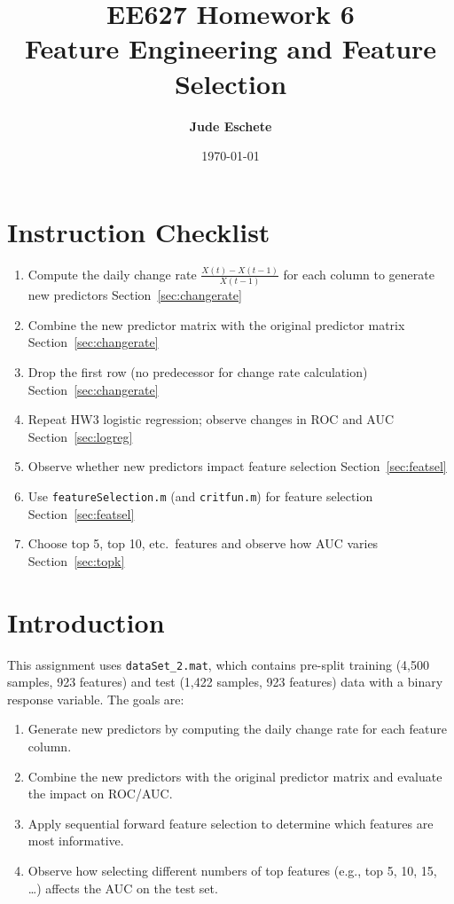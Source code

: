 \documentclass[12pt]{article}
\title{\textbf{EE627 Homework 6\\ Feature Engineering and Feature Selection}}
\author{\textbf{Jude Eschete}}
\date{\today}
\begin{document}
	\maketitle

	\newpage
	\section*{Instruction Checklist}

	\begin{enumerate}
		\item[\checkmark] Compute the daily change rate $\frac{X(t)-X(t-1)}{X(t-1)}$ for each column to generate new predictors \dotfill Section~\ref{sec:changerate}
		\item[\checkmark] Combine the new predictor matrix with the original predictor matrix \dotfill Section~\ref{sec:changerate}
		\item[\checkmark] Drop the first row (no predecessor for change rate calculation) \dotfill Section~\ref{sec:changerate}
		\item[\checkmark] Repeat HW3 logistic regression; observe changes in ROC and AUC \dotfill Section~\ref{sec:logreg}
		\item[\checkmark] Observe whether new predictors impact feature selection \dotfill Section~\ref{sec:featsel}
		\item[\checkmark] Use \texttt{featureSelection.m} (and \texttt{critfun.m}) for feature selection \dotfill Section~\ref{sec:featsel}
		\item[\checkmark] Choose top 5, top 10, etc.\ features and observe how AUC varies \dotfill Section~\ref{sec:topk}
	\end{enumerate}

	\newpage
	\section{Introduction}

	This assignment uses \texttt{dataSet\_2.mat}, which contains pre-split training (4{,}500 samples, 923 features) and test (1{,}422 samples, 923 features) data with a binary response variable. The goals are:

	\begin{enumerate}
		\item Generate new predictors by computing the daily change rate for each feature column.
		\item Combine the new predictors with the original predictor matrix and evaluate the impact on ROC/AUC.
		\item Apply sequential forward feature selection to determine which features are most informative.
		\item Observe how selecting different numbers of top features (e.g., top 5, 10, 15, \ldots) affects the AUC on the test set.
	\end{enumerate}
\end{document}
